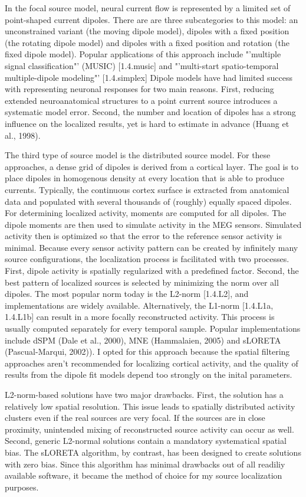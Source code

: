 In the focal source model, neural current flow is represented by a limited set of point-shaped current dipoles.
There are are three subcategories to this model: an unconstrained variant (the moving dipole model), dipoles with a fixed position (the rotating dipole model) and dipoles with a fixed position and rotation (the fixed dipole model).
Popular applications of this approach include "'multiple signal classification"' (MUSIC) [1.4.music] and "'multi-start spatio-temporal multiple-dipole modeling"' [1.4.simplex]
Dipole models have had limited success with representing neuronal responses for two main reasons.
First, reducing extended neuroanatomical structures to a point current source introduces a systematic model error.
Second, the number and location of dipoles has a strong influence on the localized results, yet is hard to estimate in advance (Huang et al., 1998).

The third type of source model is the distributed source model.
For these approaches, a dense grid of dipoles is derived from a cortical layer.
The goal is to place dipoles in homogenous density at every location that is able to produce currents.
Typically, the continuous cortex surface is extracted from anatomical data and populated with several thousands of (roughly) equally spaced dipoles.
For determining localized activity, moments are computed for all dipoles.
The dipole moments are then used to simulate activity in the MEG sensors.
Simulated activity then is optimized so that the error to the reference sensor activity is minimal.
Because every sensor activity pattern can be created by infinitely many source configurations, the localization process is facilitated with two processes.
First, dipole activity is spatially regularized with a predefined factor.
Second, the best pattern of localized sources is selected by minimizing the norm over all dipoles.
The most popular norm today is the L2-norm [1.4.L2], and implementations are widely available.
Alternatively, the L1-norm [1.4.L1a, 1.4.L1b] can result in a more focally reconstructed activity.
This process is usually computed separately for every temporal sample.
Popular implementations include dSPM (Dale et al., 2000), MNE (Hammalaien, 2005) and sLORETA (Pascual-Marqui, 2002)).
I opted for this approach because the spatial filtering approaches aren't recommended for localizing cortical activity, and the quality of results from the dipole fit models depend too strongly on the inital parameters.

L2-norm-based solutions have two major drawbacks.
First, the solution has a relatively low spatial resolution.
This issue leads to spatially distributed activity clusters even if the real sources are very focal.
If the sources are in close proximity, unintended mixing of reconstructed source activity can occur as well.
Second, generic L2-normal solutions contain a mandatory systematical spatial bias.
The sLORETA algorithm, by contrast, has been designed to create solutions with zero bias.
Since this algorithm has minimal drawbacks out of all readiliy available software, it became the method of choice for my source localization purposes.

